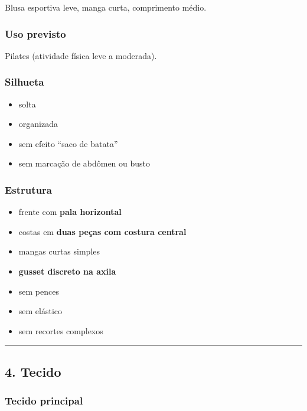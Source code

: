 \documentclass[
  10pt,oneside]{article}
\providecommand{\tightlist}{%
  \setlength{\itemsep}{0pt}\setlength{\parskip}{0pt}}
\begin{document}
Blusa esportiva leve, manga curta, comprimento médio.

\subsubsection{Uso previsto}\label{uso-previsto}

Pilates (atividade física leve a moderada).

\subsubsection{Silhueta}\label{silhueta}

\begin{itemize}
\tightlist
\item
  solta
\item
  organizada
\item
  sem efeito ``saco de batata''
\item
  sem marcação de abdômen ou busto
\end{itemize}

\subsubsection{Estrutura}\label{estrutura}

\begin{itemize}
\tightlist
\item
  frente com \textbf{pala horizontal}
\item
  costas em \textbf{duas peças com costura central}
\item
  mangas curtas simples
\item
  \textbf{gusset discreto na axila}
\item
  sem pences
\item
  sem elástico
\item
  sem recortes complexos
\end{itemize}

\begin{center}\rule{0.5\linewidth}{0.5pt}\end{center}

\subsection{4. Tecido}\label{tecido}

\subsubsection{Tecido principal}\label{tecido-principal}
\end{document}
